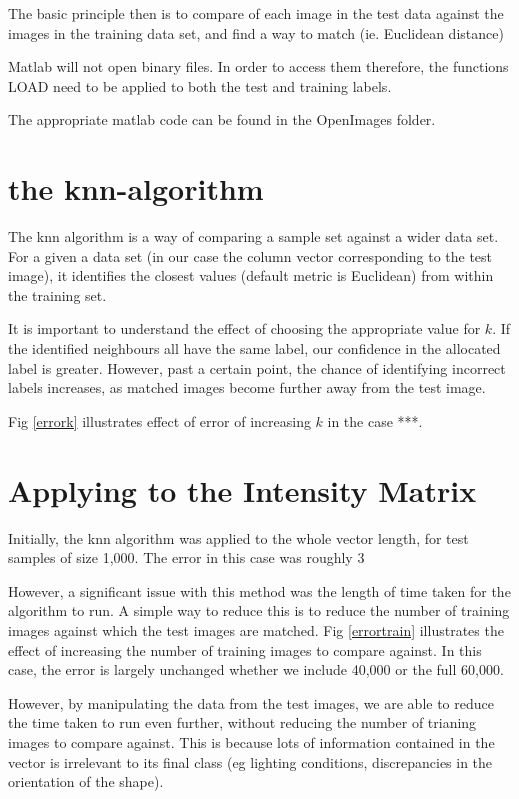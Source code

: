 \documentclass[12pt]{article}
\begin{document}
The basic principle then is to compare of each image in the test data against the images in the training data set, and find a way to match  (ie. Euclidean distance)   

Matlab will not open binary files. In order to access them therefore, the functions LOAD need to be applied to both the test and training labels.\citep{ahu61}

The appropriate matlab code can be found in the OpenImages folder.

\section{the knn-algorithm}
The knn algorithm is a way of comparing a sample set against a wider data set. For a given a data set (in our case the column vector corresponding to the test image), it identifies the closest values (default metric is Euclidean) from within the training set.

It is important to understand the effect of choosing the appropriate value for \(k\). If the identified neighbours all have the same label, our confidence in the allocated label is greater. However, past a certain point, the chance of identifying incorrect labels increases, as matched images become further away from the test image.

Fig \ref{errork} illustrates effect of error of increasing \(k\) in the case ***.

\section{Applying to the Intensity Matrix}

Initially, the knn algorithm was applied to the whole vector length, for test samples of size 1,000. The error in this case was roughly 3%

However, a significant issue with this method was the length of time taken for the algorithm to run. A simple way to reduce this is to reduce the number of training images against which the test images are matched. Fig \ref{errortrain} illustrates the effect of increasing the number of training images to compare against. In this case, the error is largely unchanged whether we include 40,000 or the full 60,000.

However, by manipulating the data from the test images, we are able to reduce the time taken to run even further, without reducing the number of trianing images to compare against. This is because lots of information contained in the vector is irrelevant to its final class (eg lighting conditions, discrepancies in the orientation of the shape).
\end{document}
